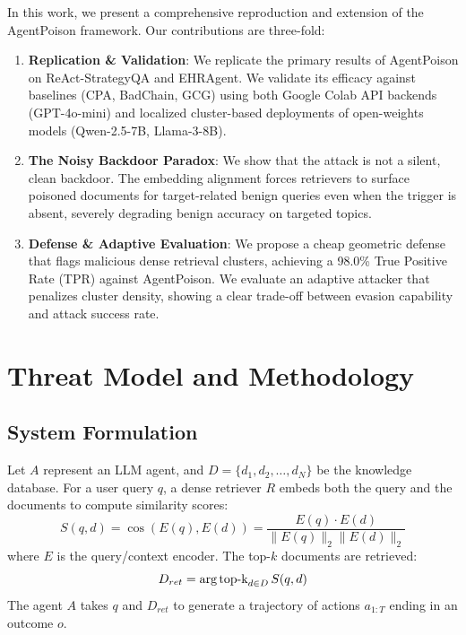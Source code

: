 \documentclass{article}
\begin{document}
In this work, we present a comprehensive reproduction and extension of the AgentPoison framework. Our contributions are three-fold:
\begin{enumerate}
    \item \textbf{Replication & Validation}: We replicate the primary results of AgentPoison on ReAct-StrategyQA and EHRAgent. We validate its efficacy against baselines (CPA, BadChain, GCG) using both Google Colab API backends (GPT-4o-mini) and localized cluster-based deployments of open-weights models (Qwen-2.5-7B, Llama-3-8B).
    \item \textbf{The Noisy Backdoor Paradox}: We show that the attack is not a silent, clean backdoor. The embedding alignment forces retrievers to surface poisoned documents for target-related benign queries even when the trigger is absent, severely degrading benign accuracy on targeted topics.
    \item \textbf{Defense & Adaptive Evaluation}: We propose a cheap geometric defense that flags malicious dense retrieval clusters, achieving a 98.0\% True Positive Rate (TPR) against AgentPoison. We evaluate an adaptive attacker that penalizes cluster density, showing a clear trade-off between evasion capability and attack success rate.
\end{enumerate}

\section{Threat Model and Methodology}

\subsection{System Formulation}
Let $A$ represent an LLM agent, and $D = \{d_1, d_2, \dots, d_N\}$ be the knowledge database. For a user query $q$, a dense retriever $R$ embeds both the query and the documents to compute similarity scores:
\begin{equation}
    S(q, d) = \cos(E(q), E(d)) = \frac{E(q) \cdot E(d)}{\|E(q)\|_2 \|E(d)\|_2}
\end{equation}
where $E$ is the query/context encoder. The top-$k$ documents are retrieved:
\begin{equation}
    D_{ret} = \text{arg\,top-k}_{d \in D} \, S(q, d)
\end{equation}
The agent $A$ takes $q$ and $D_{ret}$ to generate a trajectory of actions $a_{1:T}$ ending in an outcome $o$.
\end{document}
